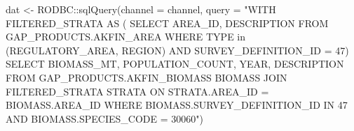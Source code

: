\documentclass[
  letterpaper,
  oneside,
  open=any]{scrbook}
\newenvironment{Shaded}{\begin{snugshade}}{\end{snugshade}}
\newcommand{\AttributeTok}[1]{\textcolor[rgb]{0.40,0.45,0.13}{#1}}
\newcommand{\FunctionTok}[1]{\textcolor[rgb]{0.28,0.35,0.67}{#1}}
\newcommand{\NormalTok}[1]{\textcolor[rgb]{0.00,0.23,0.31}{#1}}
\newcommand{\OtherTok}[1]{\textcolor[rgb]{0.00,0.23,0.31}{#1}}
\newcommand{\SpecialCharTok}[1]{\textcolor[rgb]{0.37,0.37,0.37}{#1}}
\newcommand{\StringTok}[1]{\textcolor[rgb]{0.13,0.47,0.30}{#1}}
\begin{document}
\begin{Shaded}
\begin{Highlighting}[]
\NormalTok{dat }\OtherTok{\textless{}{-}}\NormalTok{ RODBC}\SpecialCharTok{::}\FunctionTok{sqlQuery}\NormalTok{(}\AttributeTok{channel =}\NormalTok{ channel, }
                       \AttributeTok{query =} 
\StringTok{"WITH FILTERED\_STRATA AS (}
\StringTok{SELECT AREA\_ID, DESCRIPTION FROM GAP\_PRODUCTS.AKFIN\_AREA}
\StringTok{WHERE TYPE in (\textquotesingle{}REGULATORY\_AREA\textquotesingle{}, \textquotesingle{}REGION\textquotesingle{}) }
\StringTok{AND SURVEY\_DEFINITION\_ID = 47)}
\StringTok{SELECT }
\StringTok{BIOMASS\_MT,}
\StringTok{POPULATION\_COUNT, }
\StringTok{YEAR, }
\StringTok{DESCRIPTION}
\StringTok{FROM GAP\_PRODUCTS.AKFIN\_BIOMASS BIOMASS}
\StringTok{JOIN FILTERED\_STRATA STRATA }
\StringTok{ON STRATA.AREA\_ID = BIOMASS.AREA\_ID}
\StringTok{WHERE BIOMASS.SURVEY\_DEFINITION\_ID IN 47 }
\StringTok{AND BIOMASS.SPECIES\_CODE = 30060"}\NormalTok{)}
\end{Highlighting}
\end{Shaded}
\end{document}
